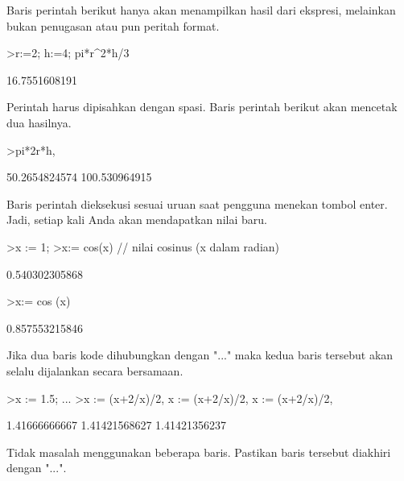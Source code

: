 \documentclass[a4paper,10pt]{article}
\begin{document}
\begin{eulernotebook}
\begin{eulercomment}
\begin{eulercomment}
\begin{eulercomment}
\begin{eulercomment}
\begin{eulercomment}
Baris perintah berikut hanya akan menampilkan hasil dari ekspresi,
melainkan bukan penugasan atau pun peritah format.
\end{eulercomment}
\begin{eulerprompt}
>r:=2; h:=4; pi*r^2*h/3
\end{eulerprompt}
\begin{euleroutput}
  16.7551608191
\end{euleroutput}
\begin{eulercomment}
Perintah harus dipisahkan dengan spasi. Baris perintah berikut akan
mencetak dua hasilnya.
\end{eulercomment}
\begin{eulerprompt}
>pi*2r*h, %
\end{eulerprompt}
\begin{euleroutput}
  50.2654824574
  100.530964915
\end{euleroutput}
\begin{eulercomment}
Baris perintah dieksekusi sesuai uruan saat pengguna menekan tombol
enter. Jadi, setiap kali Anda akan mendapatkan nilai baru.
\end{eulercomment}
\begin{eulerprompt}
>x := 1;
>x:= cos(x) // nilai cosinus (x dalam radian)
\end{eulerprompt}
\begin{euleroutput}
  0.540302305868
\end{euleroutput}
\begin{eulerprompt}
>x:= cos (x)
\end{eulerprompt}
\begin{euleroutput}
  0.857553215846
\end{euleroutput}
\begin{eulercomment}
Jika dua baris kode dihubungkan dengan "..." maka kedua baris tersebut
akan selalu dijalankan secara bersamaan.
\end{eulercomment}
\begin{eulerprompt}
>x := 1.5; ...
>x := (x+2/x)/2, x := (x+2/x)/2, x := (x+2/x)/2,
\end{eulerprompt}
\begin{euleroutput}
  1.41666666667
  1.41421568627
  1.41421356237
\end{euleroutput}
\begin{eulercomment}
Tidak masalah menggunakan beberapa baris. Pastikan baris tersebut
diakhiri dengan "...".
\end{eulercomment}

\end{eulercomment}
\end{eulercomment}
\end{eulercomment}
\end{eulercomment}
\end{eulernotebook}
\end{document}
